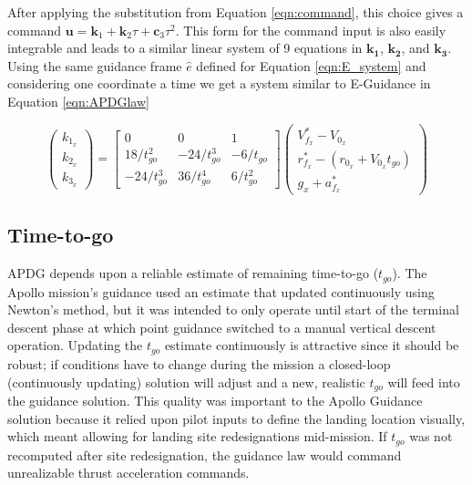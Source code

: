 After applying the substitution from Equation \ref{eqn:command}, this choice gives a command $\bm{u} = \bm{k}_1+\bm{k}_2 \tau + \bm{c}_3 \tau^2$. This form for the command input is also easily integrable and leads to a similar linear system of 9 equations in $\bm{k_1}$, $\bm{k_2}$, and $\bm{k_3}$. Using the same guidance frame $\hat{e}$ defined for Equation \ref{eqn:E_system} and considering one coordinate a time we get a system similar to E-Guidance in Equation \ref{eqn:APDGlaw}

\begin{equation}
\label{eqn:APDGlaw}
\begin{pmatrix}
k_{1_x} \\
k_{2_x} \\
k_{3_x}
\end{pmatrix}
= 
\begin{bmatrix}
0 & 0 & 1 \\
18/t_{go}^2 & -24/t_{go}^3 & -6/t_{go}\\
-24/t_{go}^3 & 36/t_{go}^4 & 6/t_{go}^2
\end{bmatrix}
\begin{pmatrix}
V_{f_x}^* - V_{0_x} \\ 
r_{f_x}^* - (r_{0_x} + V_{0_x}t_{go}) \\
g_x + a_{f_x}^*
\end{pmatrix}
\end{equation}


\subsection{Time-to-go} \label{sec:Time-to-go}
APDG depends upon a reliable estimate of remaining time-to-go ($t_{go}$). The Apollo mission's guidance used an estimate that updated continuously using Newton's method, but it was intended to only operate until start of the terminal descent phase at which point guidance switched to a manual vertical descent operation. Updating the $t_{go}$ estimate continuously is attractive since it should be robust; if conditions have to change during the mission a closed-loop (continuously updating) solution will adjust and a new, realistic $t_{go}$ will feed into the guidance solution. This quality was important to the Apollo Guidance solution because it relied upon pilot inputs to define the landing location visually, which meant allowing for landing site redesignations mid-mission. If $t_{go}$ was not recomputed after site redesignation, the guidance law would command unrealizable thrust acceleration commands.

